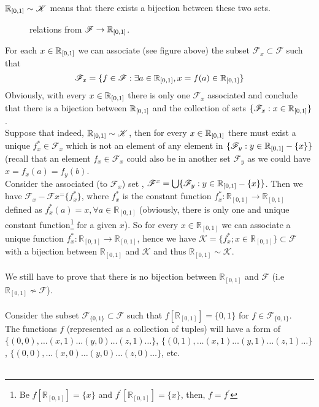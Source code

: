 $\mathbb{R}_{[0,1]}\sim\mathscr{K}$ means that there exists a bijection between these two sets. \\
\begin{figure}[H]%
    \centering
    
\caption{relations from $\mathscr{F}\rightarrow\mathbb{R}_{[0,1]} $.}
\label{fig:fig_p8b}
\end{figure}
For each $x\in \mathbb{R}_{[0,1]}$ we can associate (see figure above) the subset $\mathscr{F}_x\subset \mathscr{F}$ such that $$\mathscr{F}_x=\{f\in \mathscr{F}: \exists a \in \mathbb{R}_{[0,1]}, x= f(a)\in\mathbb{R}_{[0,1]}\}$$
Obviously, with every $x\in \mathbb{R}_{[0,1]}$ there is only one $\mathscr{F}_x$ associated and conclude that there is a bijection between $\mathbb{R}_{[0,1]}$ and the collection of sets $\{\mathscr{F}_x: x\in\mathbb{R}_{[0,1]}\}$.\\
Suppose that indeed, $\mathbb{R}_{[0,1]}\sim\mathscr{K}$, then for every $x\in\mathbb{R}_{[0,1]}$ there must exist a unique $f^*_x\in\mathscr{F}_x $ which is not an element of any element in $\{\mathscr{F}_y: y\in\mathbb{R}_{[0,1]}-\{x\}\}$ (recall that an element $f_x\in\mathscr{F}_x $ could also be in another set $\mathscr{F}_y $ as we could have $x= f_x(a)= f_y(b)$.\\
Consider the associated (to $\mathscr{F}_x$) set , $\mathscr{F}^x=\bigcup \{\mathscr{F}_y: y\in\mathbb{R}_{[0,1]}-\{x\}\}$. Then we have 
$\mathscr{F}_x-\mathscr{F}x^=\{f_x^*\}$, where $f_x^*$ is the constant function $f_x^*: \mathbb{R}_{[0,1]} \rightarrow \mathbb{R}_{[0,1]}$ defined as $f_x^*(a)=x,\forall a\in \mathbb{R}_{[0,1]}$ (obviously, there is only one and unique constant function\footnote{Be $f[\mathbb{R}_{[0,1]}]= \{x\}$ and $f^{'}[\mathbb{R}_{[0,1]}]= \{x\}$, then, $f=f^{'}$} for a given $x$). So for every $x\in \mathbb{R}_{[0,1]}$ we can associate a unique function $f_x^*: \mathbb{R}_{[0,1]} \rightarrow \mathbb{R}_{[0,1]}$, hence we have $\mathscr{K}= \{f_x^*; x\in \mathbb{R}_{[0,1]}\}\subset \mathscr{F}$ with a bijection between $\mathbb{R}_{[0,1]}$ and $\mathscr{K}$ and thus $\mathbb{R}_{[0,1]}\sim\mathscr{K}$.\\\\
 We still have to prove that there is no bijection between $\mathbb{R}_{[0,1]}$ and $\mathscr{F}$ (i.e $\mathbb{R}_{[0,1]}\not \sim \mathscr{F}$).\\\\
 Consider the subset $\mathscr{F}_{\{0,1\}}\subset \mathscr{F}$ such that $f[\mathbb{R}_{[0,1]}]=\{0,1\}$ for $f\in \mathscr{F}_{\{0,1\}}$.\\
 The functions  $f$ (represented as a collection of tuples) will have a form of $\{(0,0),\dots (x,1)\dots (y,0)\dots (z,1)\dots\}$, $\{(0,1),\dots (x,1)\dots (y,1)\dots (z,1)\dots\}$, $\{(0,0),\dots (x,0)\dots (y,0)\dots (z,0)\dots\}$,  etc. \\\\
